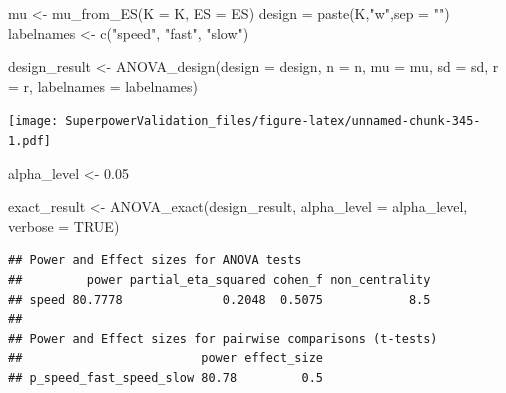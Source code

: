 \documentclass[
]{book}
\newenvironment{Shaded}{\begin{snugshade}}{\end{snugshade}}
\newcommand{\AttributeTok}[1]{\textcolor[rgb]{0.77,0.63,0.00}{#1}}
\newcommand{\ConstantTok}[1]{\textcolor[rgb]{0.00,0.00,0.00}{#1}}
\newcommand{\FloatTok}[1]{\textcolor[rgb]{0.00,0.00,0.81}{#1}}
\newcommand{\FunctionTok}[1]{\textcolor[rgb]{0.00,0.00,0.00}{#1}}
\newcommand{\NormalTok}[1]{#1}
\newcommand{\OtherTok}[1]{\textcolor[rgb]{0.56,0.35,0.01}{#1}}
\newcommand{\SpecialCharTok}[1]{\textcolor[rgb]{0.00,0.00,0.00}{#1}}
\newcommand{\StringTok}[1]{\textcolor[rgb]{0.31,0.60,0.02}{#1}}
\begin{document}
\begin{Shaded}
\begin{Highlighting}[]
\NormalTok{mu }\OtherTok{\textless{}{-}} \FunctionTok{mu\_from\_ES}\NormalTok{(}\AttributeTok{K =}\NormalTok{ K, }\AttributeTok{ES =}\NormalTok{ ES)}
\NormalTok{design }\OtherTok{=} \FunctionTok{paste}\NormalTok{(K,}\StringTok{"w"}\NormalTok{,}\AttributeTok{sep =} \StringTok{""}\NormalTok{)}
\NormalTok{labelnames }\OtherTok{\textless{}{-}} \FunctionTok{c}\NormalTok{(}\StringTok{"speed"}\NormalTok{, }\StringTok{"fast"}\NormalTok{, }\StringTok{"slow"}\NormalTok{)}

\NormalTok{design\_result }\OtherTok{\textless{}{-}} \FunctionTok{ANOVA\_design}\NormalTok{(}\AttributeTok{design =}\NormalTok{ design,}
                   \AttributeTok{n =}\NormalTok{ n, }
                   \AttributeTok{mu =}\NormalTok{ mu, }
                   \AttributeTok{sd =}\NormalTok{ sd, }
                   \AttributeTok{r =}\NormalTok{ r, }
                   \AttributeTok{labelnames =}\NormalTok{ labelnames)}
\end{Highlighting}
\end{Shaded}

\texttt{[image: SuperpowerValidation\_files/figure-latex/unnamed-chunk-345-1.pdf]}

\begin{Shaded}
\begin{Highlighting}[]
\NormalTok{alpha\_level }\OtherTok{\textless{}{-}} \FloatTok{0.05}

\NormalTok{exact\_result }\OtherTok{\textless{}{-}} \FunctionTok{ANOVA\_exact}\NormalTok{(design\_result,}
                            \AttributeTok{alpha\_level =}\NormalTok{ alpha\_level,}
                            \AttributeTok{verbose =} \ConstantTok{TRUE}\NormalTok{)}
\end{Highlighting}
\end{Shaded}

\begin{verbatim}
## Power and Effect sizes for ANOVA tests
##         power partial_eta_squared cohen_f non_centrality
## speed 80.7778              0.2048  0.5075            8.5
## 
## Power and Effect sizes for pairwise comparisons (t-tests)
##                         power effect_size
## p_speed_fast_speed_slow 80.78         0.5
\end{verbatim}

\begin{Shaded}
\end{Shaded}
\end{document}
